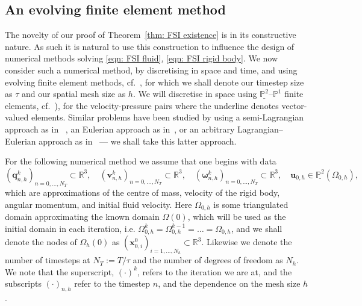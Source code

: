 \documentclass[a4paper]{amsart}
\numberwithin{equation}{section}
\theoremstyle{plain}
\newcommand{\mbf}[1]{\mathbf{#1}}
\newcommand{\mbb}[1]{\mathbb{#1}}
\begin{document}
\subsection{An evolving finite element method}
The novelty of our proof of Theorem~\ref{thm: FSI existence} is in its constructive nature.
As such it is natural to use this construction to influence the design of numerical methods solving \eqref{eqn: FSI fluid}, \eqref{eqn: FSI rigid body}.
We now consider such a numerical method, by discretising in space and time, and using evolving finite element methods, cf.~\cite{elliott2021unified}, for which we shall denote our timestep size as $\tau$ and our spatial mesh size as $h$.
We will discretise in space using $\underline{\mbb{P}^2}$--$\mbb{P}^1$ finite elements, cf.~\cite[Section 8.8]{Boffi13Book}), for the velocity-pressure pairs where the underline denotes vector-valued elements.
Similar problems have been studied by using a semi-Lagrangian approach as in
~\cite{Danilov2017NavierStokesMovingDomain}, an Eulerian approach as in~\cite{Burman2020NitscheFSI,Burman2022StokesTimeDependentDomains,Neilan2024EulerianFEMNavierStokes,vonWahl2022StokesMovingDomains}, or an arbitrary Lagrangian--Eulerian approach as in~\cite{Gao2025ALEMethodForFSI,Liu2013ALEStokes,Rao2025ALEStokes} --- we shall take this latter approach.

For the following numerical method we assume that one begins with data 
\[(\mbf{q}^k_{n,h})_{n=0,\ldots,N_T} \subset \mbb{R}^3, \quad (\mbf{v}^k_{n,h})_{n=0,\ldots,N_T} \subset \mbb{R}^3 , \quad (\boldsymbol{\omega}^k_{n,h})_{n=0,\ldots,N_T} \subset \mbb{R}^3, \quad \mbf{u}_{0,h} \in \underline{\mbb{P}^2}(\Omega_{0,h}),\]
which are approximations of the centre of mass, velocity of the rigid body, angular momentum, and initial fluid velocity.
Here $\Omega_{0,h}$ is some triangulated domain approximating the known domain $\Omega(0)$, which will be used as the initial domain in each iteration, i.e. $\Omega_{0,h}^k = \Omega_{0,h}^{k-1} = \ldots = \Omega_{0,h}$, and we shall denote the nodes of $\Omega_h(0)$ as $(\mbf{x}^0_{0,i})_{i=1,\ldots, N_h} \subset \mbb{R}^3$.
Likewise we denote the number of timesteps at $N_T := T/\tau$ and the number of degrees of freedom as $N_h$.
We note that the superscript, $(\cdot)^k$, refers to the iteration we are at, and the subscripts $(\cdot)_{n,h}$ refer to the timestep $n$, and the dependence on the mesh size $h$.
\end{document}

